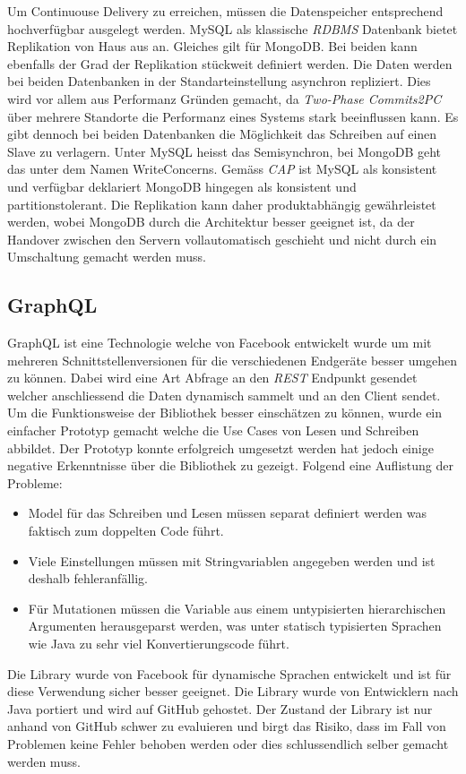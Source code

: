 Um Continuouse Delivery zu erreichen, müssen die Datenspeicher entsprechend hochverfügbar ausgelegt werden. MySQL als klassische \textit{\gls{RDBMS}} Datenbank bietet Replikation von Haus aus an. Gleiches gilt für MongoDB. Bei beiden kann ebenfalls der Grad der Replikation stückweit definiert werden. Die Daten werden bei beiden Datenbanken in der Standarteinstellung asynchron repliziert. Dies wird vor allem aus Performanz Gründen gemacht, da \textit{Two-Phase Commits\gls{2PC}} über mehrere Standorte die Performanz eines Systems stark beeinflussen kann. Es gibt dennoch bei beiden Datenbanken die Möglichkeit das Schreiben auf einen Slave zu verlagern. Unter MySQL heisst das Semisynchron, bei MongoDB geht das unter dem Namen WriteConcerns. Gemäss \textit{\gls{CAP}} ist MySQL als konsistent und verfügbar deklariert MongoDB hingegen als konsistent und partitionstolerant. Die Replikation kann daher produktabhängig gewährleistet werden, wobei MongoDB durch die Architektur besser geeignet ist, da der Handover zwischen den Servern vollautomatisch geschieht und nicht durch ein Umschaltung gemacht werden muss.

\subsection{GraphQL}

GraphQL ist eine Technologie welche von Facebook entwickelt wurde um mit mehreren Schnittstellenversionen für die verschiedenen Endgeräte besser umgehen zu können. Dabei wird eine Art Abfrage an den \textit{\gls{REST}} Endpunkt gesendet welcher anschliessend die Daten dynamisch sammelt und an den Client sendet. Um die Funktionsweise der Bibliothek besser einschätzen zu können, wurde ein einfacher Prototyp gemacht welche die Use Cases von Lesen und Schreiben abbildet.\newline
Der Prototyp konnte erfolgreich umgesetzt werden hat jedoch einige negative Erkenntnisse über die Bibliothek zu gezeigt. Folgend eine Auflistung der Probleme:
\begin{itemize}
	\item Model für das Schreiben und Lesen müssen separat definiert werden was faktisch zum doppelten Code führt.
	\item Viele Einstellungen müssen mit Stringvariablen angegeben werden und ist deshalb fehleranfällig.
	\item Für Mutationen müssen die Variable aus einem untypisierten hierarchischen Argumenten herausgeparst werden, was unter statisch typisierten Sprachen wie Java zu sehr viel Konvertierungscode führt.
\end{itemize}
Die Library wurde von Facebook für dynamische Sprachen entwickelt und ist für diese Verwendung sicher besser geeignet. Die Library wurde von Entwicklern nach Java portiert und wird auf GitHub gehostet. Der Zustand der Library ist nur anhand von GitHub schwer zu evaluieren und birgt das Risiko, dass im Fall von Problemen keine Fehler behoben werden oder dies schlussendlich selber gemacht werden muss.

